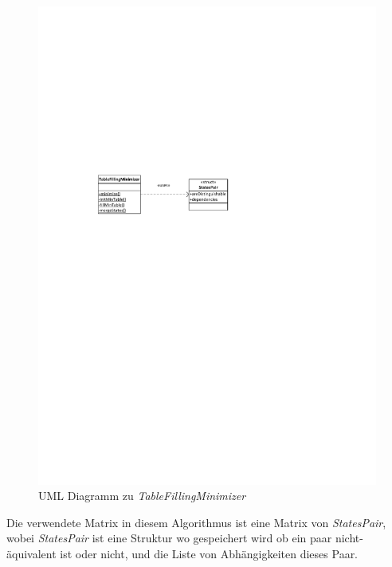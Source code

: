\begin{figure}[h]
  \begin{center}
  \includegraphics{objectsToInclude/TableFillingMinimizer.pdf}
  \caption{UML Diagramm zu \textit{TableFillingMinimizer}}
  \label{fig:UMLminTable}
  \end{center}
\end{figure}

Die verwendete Matrix in diesem Algorithmus ist eine Matrix von
\textit{StatesPair}, wobei \textit{StatesPair} ist eine Struktur wo gespeichert
wird ob ein paar nicht-äquivalent ist oder nicht, und die Liste von
Abhängigkeiten dieses Paar.
